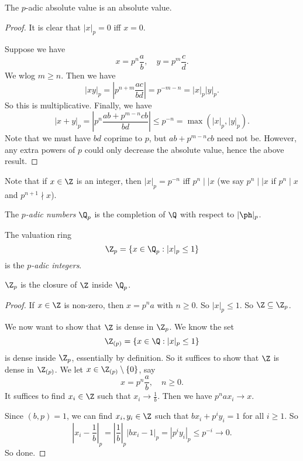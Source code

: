 \documentclass[a4paper]{article}
\begin{document}
\begin{prop}
  The $p$-adic absolute value is an absolute value.
\end{prop}

\begin{proof}
  It is clear that $|x|_p = 0$ iff $x = 0$.

  Suppose we have
  \[
    x = p^n \frac{a}{b},\quad y = p^m \frac{c}{d}.
  \]
  We wlog $m \geq n$. Then we have
  \[
    |xy|_p = \left|p^{n + m}\frac{ac}{bd}\right| = p^{-m-n} = |x|_p |y|_p.
  \]
  So this is multiplicative. Finally, we have
  \[
    |x + y|_p = \left|p^n \frac{ab + p^{m - n}cb}{bd}\right| \leq p^{-n} = \max(|x|_p, |y|_p).
  \]
  Note that we must have $bd$ coprime to $p$, but $ab + p^{m - n}cb$ need not be. However, any extra powers of $p$ could only decrease the absolute value, hence the above result.
\end{proof}

Note that if $x \in \Z$ is an integer, then $|x|_p = p^{-n}$ iff $p^n \mid\mid x$ (we say $p^n \mid\mid x$ if $p^n \mid x$ and $p^{n + 1} \nmid x$).

\begin{defi}
  The \emph{$p$-adic numbers} $\Q_p$ is the completion of $\Q$ with respect to $|\ph|_p$.
\end{defi}

\begin{defi}
  The valuation ring
  \[
    \Z_p = \{x \in \Q_p: |x|_p \leq 1\}
  \]
  is the \emph{$p$-adic integers}.
\end{defi}

\begin{prop}
  $\Z_p$ is the closure of $\Z$ inside $\Q_p$.
\end{prop}

\begin{proof}
  If $x \in \Z$ is non-zero, then $x = p^na$ with $n \geq 0$. So $|x|_p \leq 1$. So $\Z \subseteq \Z_p$.

  We now want to show that $\Z$ is dense in $\Z_p$. We know the set
  \[
    \Z_{(p)} = \{x \in \Q: |x|_p \leq 1\}
  \]
  is dense inside $\Z_p$, essentially by definition. So it suffices to show that $\Z$ is dense in $\Z_{(p)}$. We let $x \in \Z_{(p)} \setminus\{0\}$, say
  \[
    x = p^n \frac{a}{b},\quad n \geq 0.
  \]
  It suffices to find $x_i \in \Z$ such that $x_i \to \frac{1}{b}$. Then we have $p^n ax_i \to x$.

  Since $(b, p) = 1$, we can find $x_i, y_i \in \Z$ such that $b x_i + p^i y_i = 1$ for all $i \geq 1$. So
  \[
    \left|x_i - \frac{1}{b}\right|_p = \left|\frac{1}{b}\right|_p |bx_i - 1|_p = |p^i y_i|_p \leq p^{-i} \to 0.
  \]
  So done.
\end{proof}
\end{document}
